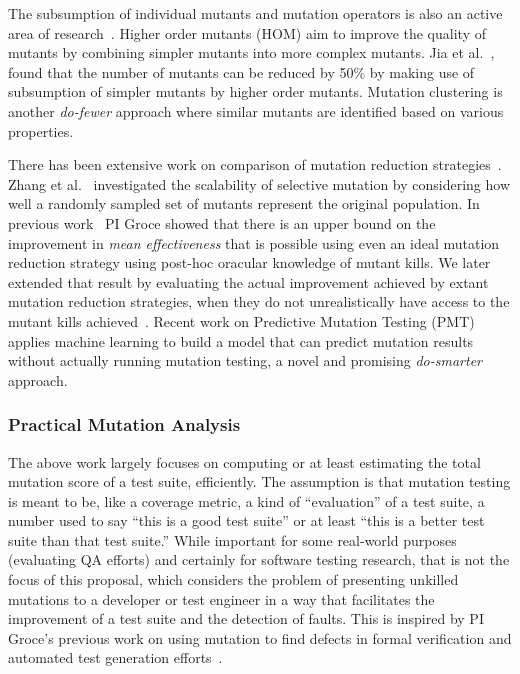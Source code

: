 The subsumption of individual mutants and mutation operators is also an active
area of research~\cite{gopinath2016measuring,shin2016theoretical,lindstrom2015redundant}.
Higher order mutants (HOM) aim to improve the quality of
mutants by combining simpler mutants into more complex mutants. Jia et
al.~\cite{jia2009higher,jia2008constructing}, found that the number of mutants
can be reduced by 50\% by making use of subsumption of simpler mutants
by higher order mutants.
Mutation clustering\cite{derezinska2015toward,strug2012machine,hussain2008mutation} is another \emph{do-fewer}
approach where similar mutants are identified based on various
properties.

There has been extensive work on comparison of mutation
reduction strategies~\cite{zhang2010isoperator,zhang2013operator}.
Zhang et al.~\cite{zhang2014an} investigated the scalability of
selective mutation by considering how well a randomly sampled set of mutants
represent the original population. 
In previous work~\cite{gopinath2016on} PI Groce showed that there is
an upper bound on the improvement
in \emph{mean effectiveness} that is possible using even
an ideal mutation reduction strategy using post-hoc oracular knowledge of mutant
kills. We later extended that result by evaluating the actual improvement
achieved by extant mutation reduction strategies, when they do not
unrealistically have access to the
mutant kills achieved~\cite{gopinath2017mutation}.  Recent work on Predictive 
Mutation Testing (PMT)~\cite{zhang2016predictive} applies machine 
learning to build a model that can predict mutation results without 
actually running mutation testing, a novel and promising
\emph{do-smarter} approach.



\subsubsection{Practical Mutation Analysis}

The above work largely focuses on computing or at least estimating the
total mutation score of a
test suite, efficiently.  The assumption is that mutation testing is
meant to be, like a coverage metric, a kind of ``evaluation'' of a
test suite, a number used to say ``this is a good test suite'' or at
least ``this is a better test suite than that test suite.''  While
important for some real-world purposes (evaluating QA efforts) and
certainly for software testing research, that is not the focus of this
proposal, which considers the problem of presenting unkilled mutations to
a developer or test engineer in a way that facilitates the improvement
of a test suite and the detection of faults.  This is inspired by PI Groce's
previous work on using mutation to find defects in formal verification
and automated test generation
efforts~\cite{groce2015verified,groce2018verified,mutKernel}.


